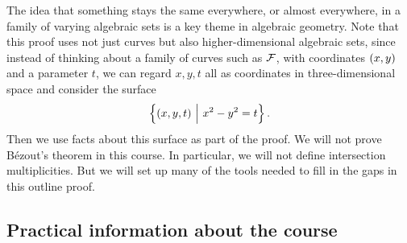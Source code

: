 \pagebreak

The idea that something stays the same everywhere, or almost everywhere, in a family of varying algebraic sets is a key theme in algebraic geometry. Note that this proof uses not just curves but also higher-dimensional algebraic sets, since instead of thinking about a family of curves such as $ \mathcal{F} $, with coordinates $ \br{x, y} $ and a parameter $ t $, we can regard $ x, y, t $ all as coordinates in three-dimensional space and consider the surface
$$ \cbr{\br{x, y, t} \st x^2 - y^2 = t}. $$
Then we use facts about this surface as part of the proof. We will not prove B\'ezout's theorem in this course. In particular, we will not define intersection multiplicities. But we will set up many of the tools needed to fill in the gaps in this outline proof.

\subsection{Practical information about the course}

